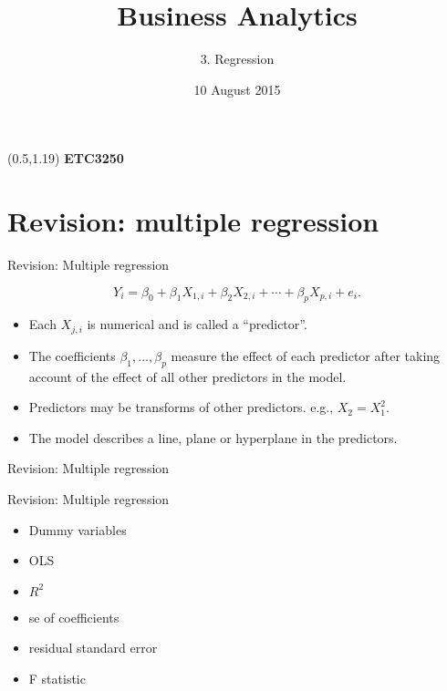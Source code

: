 \documentclass[14pt]{beamer}
\title[3. Regression]{Business Analytics}
\author{3. Regression}
\date{10 August 2015}
\makeatletter
\def\biz{\begin{itemize}[<+-| alert@+>]}
\def\eiz{\end{itemize}}
\makeatother
\begin{document}
\begin{frame}[plain]{}
\maketitle
\begin{textblock}{11}(0.5,1.19){\color{white}\large
\textbf{ETC3250}}
\end{textblock}
\end{frame}

\section{Revision: multiple regression}


\begin{frame}{Revision: Multiple regression}

\begin{block}{}\vspace*{-0.2cm}
$$Y_i = \beta_0 + \beta_1 X_{1,i} + \beta_2 X_{2,i} + \cdots + \beta_pX_{p,i} + e_i.$$
\end{block}
\biz
\item Each $X_{j,i}$ is numerical and is called a ``predictor''.

\item The coefficients $\beta_1,\dots,\beta_p$ measure the effect of each
predictor after taking account of the effect of all other predictors
in the model.


\item Predictors may be transforms of other predictors. e.g., $X_2=X_1^2$.

\item The model describes a line, plane or hyperplane in the predictors.


\eiz

\end{frame}

\begin{frame}{Revision: Multiple regression}
\end{frame}

\begin{frame}{Revision: Multiple regression}\large
\begin{itemize}[<+-| alert@+>]
\item Dummy variables
\item OLS
\item $R^2$
\item se of coefficients
\item residual standard error
\item F statistic
\end{itemize}
\end{frame}
\end{document}
